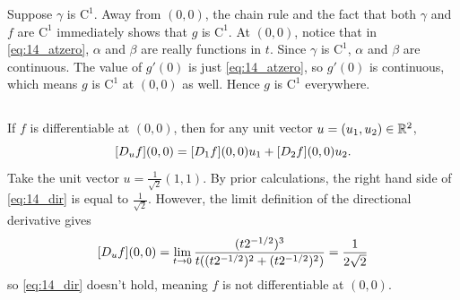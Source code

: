 \documentclass[12pt]{article}
\begin{document}
Suppose $\gamma$ is $\text{C}^{1}$. 
Away from $(0, 0)$, the chain rule and the fact that both $\gamma$ and $f$ are $\text{C}^{1}$ immediately shows that $g$ is $\text{C}^{1}$. 
At $(0, 0)$, notice that in \eqref{eq:14_atzero}, $\alpha$ and $\beta$ are really functions in $t$. 
Since $\gamma$ is $\text{C}^{1}$, $\alpha$ and $\beta$ are continuous. 
The value of $g'(0)$ is just \eqref{eq:14_atzero}, so $g'(0)$ is continuous, 
which means $g$ is $\text{C}^{1}$ at $(0, 0)$ as well. 
Hence $g$ is $\text{C}^{1}$ everywhere. 

\subsection{}
If $f$ is differentiable at $(0, 0)$, then for any unit vector $u = (u_1, u_2) \in \mathbb{R}^2$, 
\begin{equation} \label{eq:14_dir}
 [D_{u}f](0, 0) = [D_{1}f](0, 0)u_1 + [D_{2}f](0, 0)u_2.
\end{equation}
Take the unit vector $u = \frac{1}{\sqrt{2}}(1, 1)$. 
By prior calculations, the right hand side of \eqref{eq:14_dir} is equal to $\frac{1}{\sqrt{2}}$. 
However, the limit definition of the directional derivative gives 
$$[D_{u}f](0, 0) = \lim_{t \rightarrow 0} \frac{(t 2^{-1/2})^3}{t ((t2^{-1/2})^2 + (t 2^{-1/2})^2 )} = \frac{1}{2\sqrt{2}}$$
so \eqref{eq:14_dir} doesn't hold, meaning $f$ is not differentiable at $(0, 0)$. 
\end{document}
